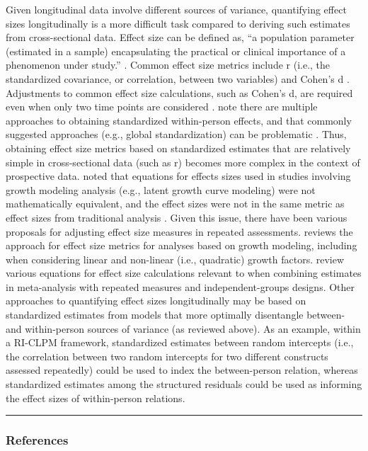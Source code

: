 \documentclass[
  10pt,
  letterpaper,
]{article}
\begin{document}
Given longitudinal data involve different sources of variance,
quantifying effect sizes longitudinally is a more difficult task
compared to deriving such estimates from cross-sectional data. Effect
size can be defined as, ``a population parameter (estimated in a sample)
encapsulating the practical or clinical importance of a phenomenon under
study.'' \citep{kraemer2014}. Common effect size metrics include r
(i.e., the standardized covariance, or correlation, between two
variables) and Cohen's d \citep{cohen1988}. Adjustments to common effect
size calculations, such as Cohen's d, are required even when only two
time points are considered \citep[e.g., see][]{morris2002}.
\citet{wang2019a} note there are multiple approaches to obtaining
standardized within-person effects, and that commonly suggested
approaches (e.g., global standardization) can be problematic
\citep[see][for more details]{wang2019a}. Thus, obtaining effect size
metrics based on standardized estimates that are relatively simple in
cross-sectional data (such as r) becomes more complex in the context of
prospective data. \citet{feingold2009} noted that equations for effects
sizes used in studies involving growth modeling analysis (e.g., latent
growth curve modeling) were not mathematically equivalent, and the
effect sizes were not in the same metric as effect sizes from
traditional analysis \citep[see][for more details]{feingold2009}. Given
this issue, there have been various proposals for adjusting effect size
measures in repeated assessments. \citet{feingold2019} reviews the
approach for effect size metrics for analyses based on growth modeling,
including when considering linear and non-linear (i.e., quadratic)
growth factors. \citet{morris2002} review various equations for effect
size calculations relevant to when combining estimates in meta-analysis
with repeated measures and independent-groups designs. Other approaches
to quantifying effect sizes longitudinally may be based on standardized
estimates from models that more optimally disentangle between- and
within-person sources of variance (as reviewed above). As an example,
within a RI-CLPM framework, standardized estimates between random
intercepts (i.e., the correlation between two random intercepts for two
different constructs assessed repeatedly) could be used to index the
between-person relation, whereas standardized estimates among the
structured residuals could be used as informing the effect sizes of
within-person relations.

\begin{center}\rule{0.5\linewidth}{0.5pt}\end{center}

\hypertarget{references}{%
\subsubsection{References}\label{references}}

\renewcommand{\bibsection}{}



\nolinenumbers
\end{document}
